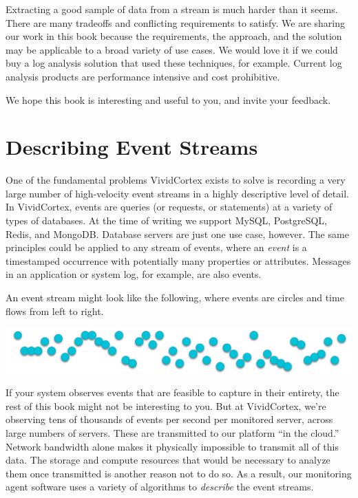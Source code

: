\documentclass{vivid_layout}
\begin{document}
Extracting a good sample of data from a stream is much harder than it seems.
There are many tradeoffs and conflicting requirements to satisfy. We are sharing
our work in this book because the requirements, the approach, and the solution
may be applicable to a broad variety of use cases. We would love it if we could
buy a log analysis solution that used these techniques, for example. Current log
analysis products are performance intensive and cost prohibitive.

We hope this book is interesting and useful to you, and invite your feedback.

\newpage

\section{Describing Event Streams}

One of the fundamental problems VividCortex exists to solve is recording a very
large number of high-velocity event streams in a highly descriptive level of
detail. In VividCortex, events are queries (or requests, or statements) at a
variety of types of databases. At the time of writing we support MySQL,
PostgreSQL, Redis, and MongoDB. Database servers are just one use case, however.
The same principles could be applied to any stream of events, where an
\emph{event} is a timestamped occurrence with potentially many properties or
attributes. Messages in an application or system log, for example, are also
events.

An event stream might look like the following, where events are circles and time
flows from left to right.

\begin{center}
\includegraphics[width=.85\linewidth]{sketch-sampling/event-stream}
\end{center}

If your system observes events that are feasible to capture in their entirety,
the rest of this book might not be interesting to you. But at VividCortex, we're
observing tens of thousands of events per second per monitored server, across large
numbers of servers. These are transmitted to our platform ``in the cloud.''
Network bandwidth alone makes it physically impossible to transmit all of this
data. The storage and compute resources that would be necessary to analyze them
once transmitted is another reason not to do so. As a result, our monitoring
agent software uses a variety of algorithms to \emph{describe} the event
streams.
\end{document}
